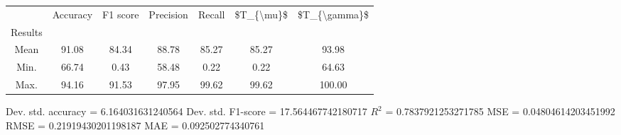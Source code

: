 \begin{tabular}{|c|c|c|c|c|c|c|}
\toprule
{} &  Accuracy &  F1 score &  Precision &  Recall &  \$T\_\{\textbackslash mu\}\$ &  \$T\_\{\textbackslash gamma\}\$ \\
Results &           &           &            &         &            &               \\
\hline
Mean    &     91.08 &     84.34 &      88.78 &   85.27 &      85.27 &         93.98 \\
Min.    &     66.74 &      0.43 &      58.48 &    0.22 &       0.22 &         64.63 \\
Max.    &     94.16 &     91.53 &      97.95 &   99.62 &      99.62 &        100.00 \\
\bottomrule
\end{tabular}

 Dev. std. accuracy = 6.164031631240564
 Dev. std. F1-score = 17.564467742180717
 $R^2$ = 0.7837921253271785
 MSE = 0.04804614203451992
 RMSE = 0.21919430201198187
 MAE = 0.092502774340761